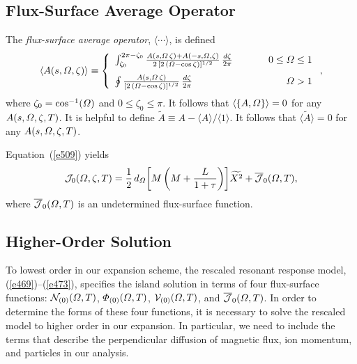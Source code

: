 \documentclass[12pt,prb,aps]{revtex4-1}
\begin{document}
\subsection{Flux-Surface Average Operator}
The {\em flux-surface average operator}, $\langle\cdots\rangle$, is defined\,\cite{rutherford}
\begin{equation}
\langle A(s,{\mit\Omega},\zeta)\rangle
\equiv \left\{
\begin{array}{llr}
\int_{\zeta_0}^{2\pi-\zeta_0}\frac{A(s,{\mit\Omega}\,\zeta)+A(-s,{\mit\Omega},\zeta)}{2\,[2\,({\mit\Omega}-\cos\zeta)]^{1/2}}\,\frac{d\zeta}{2\pi}&~~~~~&0\leq {\mit\Omega}\leq 1\\[2ex]
\oint \frac{A(s,{\mit\Omega}\,\zeta)}{[2\,({\mit\Omega}-\cos\zeta)]^{1/2}}\,\frac{d\zeta}{2\pi}
&&{\mit\Omega}> 1
\end{array}
\right.,
\end{equation}
where $\zeta_0=\cos^{-1}({\mit\Omega})$ and $0\leq\zeta_0\leq\pi$. 
It follows that
$\langle\{A,{\mit\Omega}\}\rangle = 0$
for any $A(s,{\mit\Omega},\zeta,T)$. It is helpful to define
$\tilde{A}  \equiv A - \langle A\rangle/\langle 1\rangle$.
It follows that 
$\langle \tilde{A}\rangle =0$
 for any $A(s,{\mit\Omega},\zeta,T)$.

Equation~(\ref{e509}) yields 
\begin{equation}\label{e513}
{\cal J}_0({\mit\Omega},\zeta,T)= 
\frac{1}{2}\,d_{\mit\Omega}\!\left[M\left(M+\frac{L}{1+\tau}\right)\right]\!\widetilde{X^2} + \overline{\cal J}_0({\mit\Omega},T),
\end{equation}
where $\overline{{\cal J}}_0({\mit\Omega},T)$ is an undetermined flux-surface function. 

\subsection{Higher-Order Solution}
To lowest order in our expansion scheme, the rescaled resonant response model, (\ref{e469})--(\ref{e473}), specifies the
island solution in terms of four flux-surface functions: 
 ${\cal N}_{(0)}({\mit\Omega},T)$,
${\mit\Phi}_{(0)}({\mit\Omega},T)$,  ${\cal V}_{(0)}({\mit\Omega},T)$, and $\overline{\cal J}_0({\mit\Omega},T)$. In order to determine
the forms of these  four  functions,  it is necessary to solve the rescaled model to higher order in our expansion. In particular,
we need to include the terms that describe the perpendicular diffusion of magnetic flux, ion momentum, and
particles in our analysis.  
\end{document}
